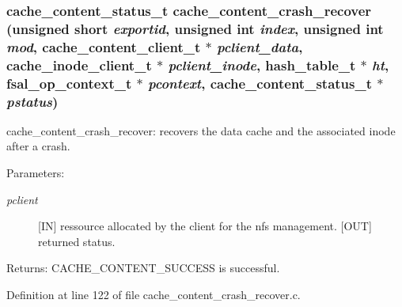 \subsubsection[{cache\_\-content\_\-crash\_\-recover}]{\setlength{\rightskip}{0pt plus 5cm}cache\_\-content\_\-status\_\-t cache\_\-content\_\-crash\_\-recover (unsigned short {\em exportid}, \/  unsigned int {\em index}, \/  unsigned int {\em mod}, \/  cache\_\-content\_\-client\_\-t $\ast$ {\em pclient\_\-data}, \/  cache\_\-inode\_\-client\_\-t $\ast$ {\em pclient\_\-inode}, \/  hash\_\-table\_\-t $\ast$ {\em ht}, \/  fsal\_\-op\_\-context\_\-t $\ast$ {\em pcontext}, \/  cache\_\-content\_\-status\_\-t $\ast$ {\em pstatus})}\label{cache__content__crash__recover_8c_263b98e54e97309e6e4681f23b161e18}


cache\_\-content\_\-crash\_\-recover: recovers the data cache and the associated inode after a crash.

\begin{Desc}
\item[Parameters:]
\begin{description}
\item[{\em pclient}][IN] ressource allocated by the client for the nfs management.  [OUT] returned status.\end{description}
\end{Desc}
\begin{Desc}
\item[Returns:]CACHE\_\-CONTENT\_\-SUCCESS is successful. \end{Desc}


Definition at line 122 of file cache\_\-content\_\-crash\_\-recover.c.